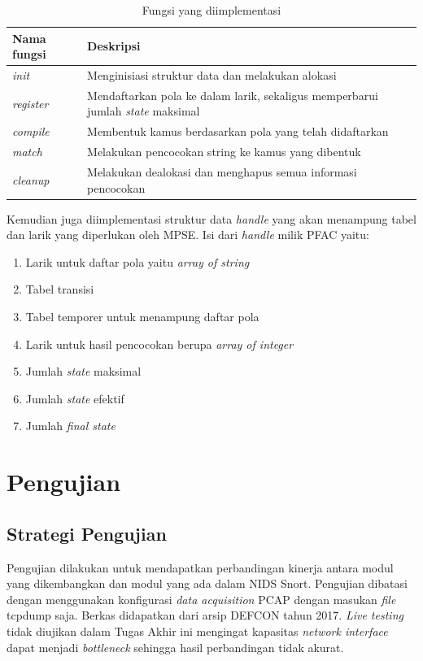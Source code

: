 \documentclass[conference]{IEEEtran}
\begin{document}
    \begin{table}[htbp]
    \caption{Fungsi yang diimplementasi}
    \begin{center}
    \begin{tabular}{|m{2cm}|m{5cm}|}
    \hline
    \rowcolor{gray!15}
    \textbf{Nama fungsi}& \textbf{Deskripsi} \\
    \hline
    \textit{init} & Menginisiasi struktur data dan melakukan alokasi \\
    \hline
    \textit{register} & Mendaftarkan pola ke dalam larik, sekaligus memperbarui jumlah \emph{state} maksimal \\
    \hline
    \textit{compile} & Membentuk kamus berdasarkan pola yang telah didaftarkan \\
    \hline
    \textit{match} & Melakukan pencocokan string ke kamus yang dibentuk \\
    \hline
    \textit{cleanup} & Melakukan dealokasi dan menghapus semua informasi pencocokan \\
    \hline
    \end{tabular}
    \label{mpse}
    \end{center}
    \end{table}

    Kemudian juga diimplementasi struktur data \emph{handle} yang akan menampung tabel dan larik yang diperlukan oleh MPSE. Isi dari \emph{handle} milik PFAC yaitu:

    \begin{enumerate}
        \item Larik untuk daftar pola yaitu \emph{array of string}
        \item Tabel transisi
        \item Tabel temporer untuk menampung daftar pola
        \item Larik untuk hasil pencocokan berupa \emph{array of integer}
        \item Jumlah \emph{state} maksimal
        \item Jumlah \emph{state} efektif
        \item Jumlah \emph{final state}
    \end{enumerate}

\section{Pengujian}
    \subsection{Strategi Pengujian}
        Pengujian dilakukan untuk mendapatkan perbandingan kinerja antara modul yang dikembangkan dan modul yang ada dalam NIDS Snort. Pengujian dibatasi dengan menggunakan konfigurasi \emph{data acquisition} PCAP dengan masukan \emph{file} tcpdump saja. Berkas didapatkan dari arsip DEFCON tahun 2017. \emph{Live testing} tidak diujikan dalam Tugas Akhir ini mengingat kapasitas \emph{network interface} dapat menjadi \emph{bottleneck} sehingga hasil perbandingan tidak akurat.
\end{document}
